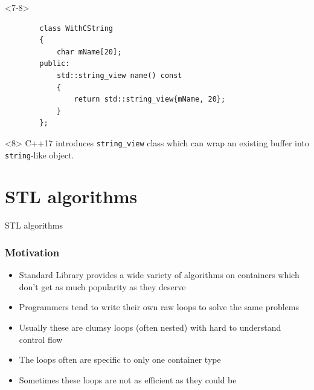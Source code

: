 \documentclass{beamer}
\begin{document}
\begin{frame}[fragile]
    \begin{onlyenv}<7-8>
    \begin{lstlisting}
        class WithCString
        {
            char mName[20];
        public:
            std::string_view name() const
            {
                return std::string_view{mName, 20};
            }
        };
    \end{lstlisting}

    \begin{block}{}<8>
        C++17 introduces \texttt{string\_view} class which can wrap an existing buffer into
        \texttt{string}-like object.
    \end{block}
    \end{onlyenv}
\end{frame}


\section{STL algorithms}

\begin{frame}
    \begin{center}
        STL algorithms
    \end{center}
\end{frame}

\begin{frame}
\frametitle{Motivation}
	\begin{itemize}
		\item Standard Library provides a wide variety of algorithms on containers which
			  don't get as much popularity as they deserve
		\pause
		\item Programmers tend to write their own raw loops to solve the same problems
		\pause
		\item Usually these are clumsy loops (often nested) with hard to understand control
			  flow
		\item The loops often are specific to only one container type
		\pause
		\item Sometimes these loops are not as efficient as they could be
	\end{itemize}
\end{frame}
\end{document}
